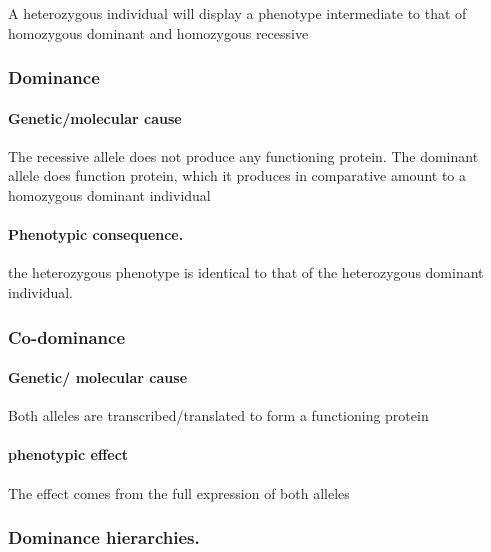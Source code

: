 \documentclass[]{article}
\let\oldparagraph\paragraph
\renewcommand{\paragraph}[1]{\oldparagraph{#1}\mbox{}}
\begin{document}
A heterozygous individual will display a phenotype intermediate to that
of homozygous dominant and homozygous recessive

\hypertarget{dominance}{%
\subsubsection{Dominance}\label{dominance}}

\hypertarget{geneticmolecular-cause}{%
\paragraph{Genetic/molecular cause}\label{geneticmolecular-cause}}

The recessive allele does not produce any functioning protein. The
dominant allele does function protein, which it produces in comparative
amount to a homozygous dominant individual

\hypertarget{phenotypic-consequence.}{%
\paragraph{Phenotypic consequence.}\label{phenotypic-consequence.}}

the heterozygous phenotype is identical to that of the heterozygous
dominant individual.

\hypertarget{co-dominance}{%
\subsubsection{Co-dominance}\label{co-dominance}}

\hypertarget{genetic-molecular-cause-1}{%
\paragraph{Genetic/ molecular cause}\label{genetic-molecular-cause-1}}

Both alleles are transcribed/translated to form a functioning protein

\hypertarget{phenotypic-effect-1}{%
\paragraph{phenotypic effect}\label{phenotypic-effect-1}}

The effect comes from the full expression of both alleles

\hypertarget{dominance-hierarchies.}{%
\subsubsection{Dominance hierarchies.}\label{dominance-hierarchies.}}
\end{document}
